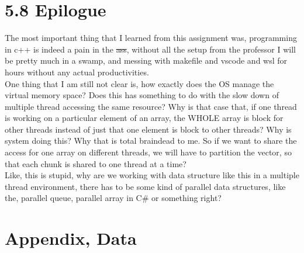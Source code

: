 \documentclass[]{article}
\begin{document}
\section*{5.8 Epilogue}
    The most important thing that I learned from this assignment was, programming in c++ is indeed a pain in the \sout{ass}, without all the setup from the professor I will be pretty much in a swamp, and messing with makefile and vscode and wsl for hours without any actual productivities. 
    \\[1.1em]
    One thing that I am still not clear is, how exactly does the OS manage the virtual memory space? Does this has something to do with the slow down of multiple thread accessing the same resource? Why is that case that, if one thread is working on a particular element of an array, the WHOLE array is block for other threads instead of just that one element is block to other threads? Why is system doing this? Why that is total braindead to me. So if we want to share the access for one array on different threads, we will have to partition the vector, so that each chunk is shared to one thread at a time? 
    \\[1.1em]
    Like, this is stupid, why are we working with data structure like this in a multiple thread environment, there has to be some kind of parallel data structures, like the, parallel queue, parallel array in C\# or something right?   
    
\section*{Appendix, Data}
\end{document}
